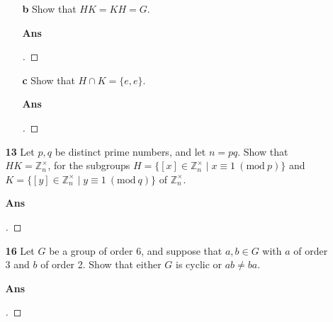 \documentclass[paper=usletter, fontsize=12pt]{article}
\newcommand{\Mod}[1]{\ (\mathrm{mod}\ #1)}
\begin{document}
\begin{itemize}
\begin{itemize}
\begin{enumerate}
                \item[\textbf{b}] Show that $HK=KH=G$.
                \item[\textbf{Ans}]
                \begin{proof}[\unskip\nopunct]
                \end{proof}
                \vspace{0.2in}

                \item[\textbf{c}] Show that $H \cap K = \{e,e\}$.
                \item[\textbf{Ans}]
                \begin{proof}[\unskip\nopunct]
                \end{proof}
                \vspace{0.2in}

            \end{enumerate}

            \item[\textbf{13}] Let $p, q$ be distinct prime numbers, and let
            $n=pq$. Show that $HK=\mathbb{Z}_{n}^{\times}$, for the subgroups
            $H=\{[x] \in \mathbb{Z}_{n}^{\times} \mid x \equiv 1 \Mod p\}$ and
            $K=\{[y] \in \mathbb{Z}_{n}^{\times} \mid y \equiv 1 \Mod q\}$ of
            $\mathbb{Z}_{n}^{\times}$.
            \item[\textbf{Ans}]
            \begin{proof}[\unskip\nopunct]
            \end{proof}
            \vspace{0.2in}

            \item[\textbf{16}] Let $G$ be a group of order 6, and suppose that
            $a, b \in G$ with $a$ of order 3 and $b$ of order 2. Show that
            either $G$ is cyclic or $ab \neq ba$.
            \item[\textbf{Ans}]
            \begin{proof}[\unskip\nopunct]
            \end{proof}
            \vspace{0.2in}

        \end{itemize}

    \end{itemize}
\end{document}
